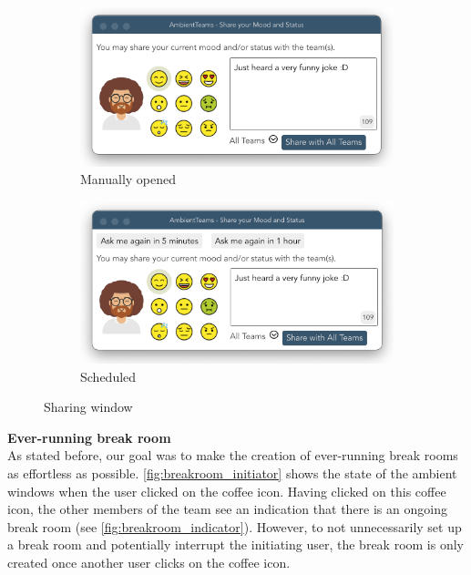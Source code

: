 \begin{figure}[h]
    \centering
    \begin{subfigure}{.5\textwidth}
        \centering
        \includegraphics[width=.8\linewidth]{./images/sharing_manual.png}
        \caption{Manually opened }
        \label{fig:sharing_manual}
    \end{subfigure}%
    \begin{subfigure}{.5\textwidth}
        \centering
        \includegraphics[width=.8\linewidth]{./images/sharing_auto.png}
        \caption{Scheduled }
        \label{fig:sharing_auto}
    \end{subfigure}
    \caption{Sharing window}
\end{figure}

\medskip\noindent\textbf{Ever-running break room} \\
As stated before, our goal was to make the creation of ever-running break rooms as effortless as possible. \autoref{fig:breakroom_initiator} shows the state of the ambient windows when the user clicked on the coffee icon. Having clicked on this coffee icon, the other members of the team see an indication that there is an ongoing break room (see \autoref{fig:breakroom_indicator}). However, to not unnecessarily set up a break room and potentially interrupt the initiating user, the break room is only created once another user clicks on the coffee icon.

